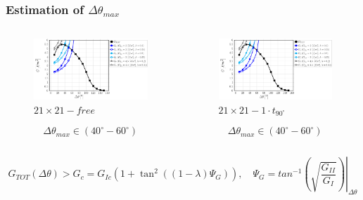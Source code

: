 \documentclass[first,firstsupp,lastsupp,last,hyperref,table]{ETHclass}
\begin{document}
\addtocounter{framenumber}{-1}

\begin{frame}
\frametitle{\vspace{0.2cm}\small Estimation of $\Delta\theta_{max}$}
\vspace{-1.25cm}
\centering
\begin{columns}[c]
\centering
\begin{column}{0.5\textwidth}
\centering
\begin{figure}
\centering
\caption{\scriptsize $21\times 21-free$}
\includegraphics[width=\columnwidth]{vf60-dsize-S10A10.pdf}
\end{figure}
\scriptsize
\begin{equation*}
\Delta\theta_{max}\in\left(40^{\circ}-60^{\circ}\right)
\end{equation*}
\end{column}
\begin{column}{0.5\textwidth}
\centering
\begin{figure}
\centering
\caption{\scriptsize$21\times 21-1\cdot t_{90^{\circ}}$}
\includegraphics[width=\columnwidth]{vf60-dsize-S10A10T1.pdf}
\end{figure}
\scriptsize
\begin{equation*}
\Delta\theta_{max}\in\left(40^{\circ}-60^{\circ}\right)
\end{equation*}
\end{column}
\end{columns}
\scriptsize
\vspace{0.25cm}
\begin{equation*}
G_{TOT}\left(\Delta\theta\right)>G_{c}=G_{Ic}\left(1+\tan^{2}\left(\left(1-\lambda\right)\Psi_{G}\right)\right),\quad\Psi_{G}=\left.tan^{-1}\left(\sqrt{\frac{G_{II}}{G_{I}}}\right)\right|_{\Delta\theta}
\end{equation*}
\end{frame}
\end{document}
